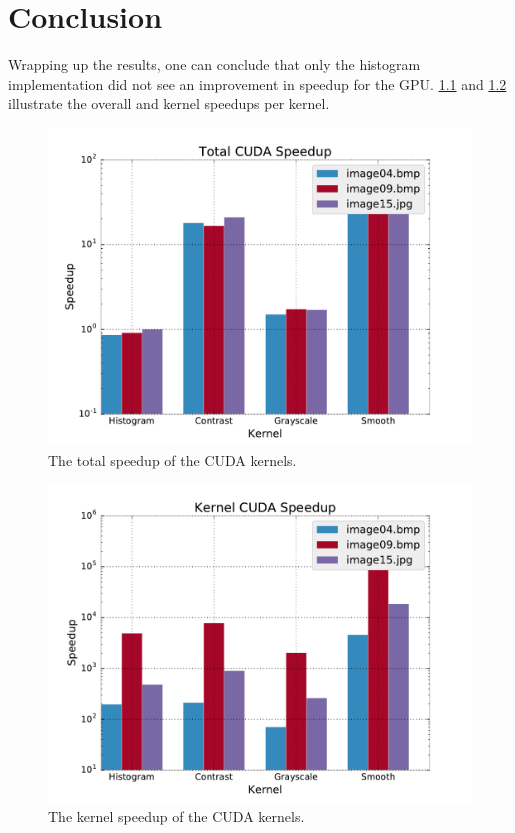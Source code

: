 \documentclass[final]{report}
\begin{document}
\chapter{Conclusion}

Wrapping up the results, one can conclude that only the histogram implementation did not see an improvement in speedup for the GPU. \cref{fig:total-cuda-speedup} and \cref{fig:kernel-cuda-speedup} illustrate the overall and kernel speedups per kernel.

\begin{figure}[H]
\centering
    \includegraphics[width=\linewidth]{resources/total-cuda-speedup.pdf}
    \caption{The total speedup of the CUDA kernels.}
    \label{fig:total-cuda-speedup}
\end{figure}

\begin{figure}[H]
\centering
    \includegraphics[width=\linewidth]{resources/kernel-cuda-speedup.pdf}
    \caption{The kernel speedup of the CUDA kernels.}
    \label{fig:kernel-cuda-speedup}
\end{figure}
\end{document}
